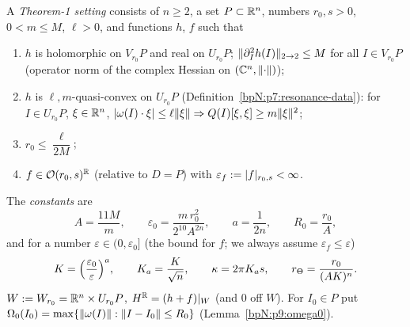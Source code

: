 \begin{definition}\label{bpN:p9:setting}
A \emph{Theorem-1 setting} consists of $n\ge2$, a set $P\subset\mathbb{R}^n$, numbers $r_0,s>0$, $0<m\le M$, $\ell>0$, and functions $h$, $f$ such that
\begin{enumerate}[label=(S\arabic*)]
\item\label{bpN:p9:s-h} $h$ is holomorphic on $V_{r_0}P$ and real on $U_{r_0}P$; $\lVert \partial_I^2h(I)\rVert_{2\to2}\le M$ for all $I\in V_{r_0}P$ (operator norm of the complex Hessian on $(\mathbb{C}^n,\lVert \cdot\rVert)$);
\item\label{bpN:p9:s-qc} $h$ is $\ell,m$-quasi-convex on $U_{r_0}P$ (Definition~\ref{bpN:p7:resonance-data}): for $I\in U_{r_0}P$, $\xi\in\mathbb{R}^n$, $\lvert \omega(I)\cdot\xi\rvert\le\ell\lVert \xi\rVert\Rightarrow Q(I)[\xi,\xi]\ge m\lVert \xi\rVert^2$;
\item\label{bpN:p9:s-r} $r_0\le\dfrac\ell{2M}$;
\item\label{bpN:p9:s-f} $f\in\mathcal O(r_0,s)^{\mathbb{R}}$ (relative to $D=P$) with $\varepsilon_f:=\lvert f\rvert_{r_0,s}<\infty$.
\end{enumerate}
The \emph{constants} are
\[A=\frac{11M}m,\qquad\varepsilon_0=\frac{m\,r_0^2}{2^{10}A^{2n}},\qquad a=\frac1{2n},\qquad R_0=\frac{r_0}A,\]
and for a number $\varepsilon\in(0,\varepsilon_0]$ (the bound for $f$; we always assume $\varepsilon_f\le\varepsilon$)
\[K=\Bigl(\frac{\varepsilon_0}\varepsilon\Bigr)^a,\qquad K_a=\frac K{\sqrt n},\qquad\kappa=2\pi K_as,\qquad r_\Theta=\frac{r_0}{(AK)^n}.\]
$W:=W_{r_0}=\mathbb{R}^n\times U_{r_0}P$, $H^{\mathbb{R}}=(h+f)|_W$ (and $0$ off $W$). For $I_0\in P$ put $\Omega_0(I_0)=\max\{\lVert \omega(I)\rVert:\lVert I-I_0\rVert\le R_0\}$ (Lemma~\ref{bpN:p9:omega0}).
\end{definition}

